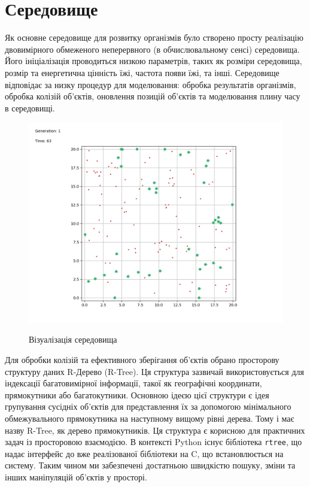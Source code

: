 

\section{Середовище}

Як основне середовище для розвитку організмів було створено 
просту реалізацію двовимірного обмеженого неперервного 
(в обчислювальному сенсі) середовища. 
Його ініціалізація проводиться низкою параметрів, 
таких як розміри середовища, розмір та енергетична цінність їжі, 
частота появи їжі, та інші. 
Середовище відповідає за низку процедур для моделювання: 
обробка результатів організмів, обробка колізій об’єктів, 
оновлення позицій об’єктів та моделювання плину часу в середовищі.


\begin{figure}[ht]
  \centering
  \caption{Візуалізація середовища}
  \includegraphics[scale=0.5]{Images/visualizing-the-environment.png}
  \label{fig:візуалізація-середовища}
\end{figure}


Для обробки колізій та ефективного зберігання об’єктів обрано 
просторову структуру даних R-Дерево (R-Tree). 
Ця структура зазвичай використовується для індексації 
багатовимірної інформації, такої як географічні координати, 
прямокутники або багатокутники.
Основною ідеєю цієї структури є ідея групування сусідніх 
об’єктів для представлення їх за допомогою мінімального 
обмежувального прямокутника на наступному вищому рівні дерева. 
Тому і має назву R-Tree, як дерево прямокутників.
Ця структура є корисною для практичних задач із просторовою взаємодією. 
В контексті Python існує бібліотека \verb+rtree+, 
що надає інтерфейс до вже реалізованої бібліотеки на C, 
що встановлюється на систему. 
Таким чином ми забезпечені достатньою швидкістю пошуку, 
зміни та інших маніпуляцій об’єктів у просторі.


